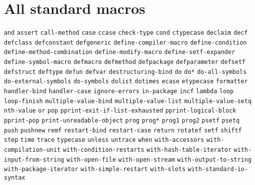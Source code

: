 \chapter{All standard macros}
\label{app-all-standard-macros}

\texttt{and}
\texttt{assert}
\texttt{call-method}
\texttt{case}
\texttt{ccase}
\texttt{check-type}
\texttt{cond}
\texttt{ctypecase}
\texttt{declaim}
\texttt{decf}
\texttt{defclass}
\texttt{defconstant}
\texttt{defgeneric}
\texttt{define-compiler-macro}
\texttt{define-condition}
\texttt{define-method-combination}
\texttt{define-modify-macro}
\texttt{define-setf-expander}
\texttt{define-symbol-macro}
\texttt{defmacro}
\texttt{defmethod}
\texttt{defpackage}
\texttt{defparameter}
\texttt{defsetf}
\texttt{defstruct}
\texttt{deftype}
\texttt{defun}
\texttt{defvar}
\texttt{destructuring-bind}
\texttt{do}
\texttt{do*}
\texttt{do-all-symbols}
\texttt{do-external-symbols}
\texttt{do-symbols}
\texttt{dolist}
\texttt{dotimes}
\texttt{ecase}
\texttt{etypecase}
\texttt{formatter}
\texttt{handler-bind}
\texttt{handler-case}
\texttt{ignore-errors}
\texttt{in-package}
\texttt{incf}
\texttt{lambda}
\texttt{loop}
\texttt{loop-finish}
\texttt{multiple-value-bind}
\texttt{multiple-value-list}
\texttt{multiple-value-setq}
\texttt{nth-value}
\texttt{or}
\texttt{pop}
\texttt{pprint-exit-if-list-exhausted}
\texttt{pprint-logical-block}
\texttt{pprint-pop}
\texttt{print-unreadable-object}
\texttt{prog}
\texttt{prog*}
\texttt{prog1}
\texttt{prog2}
\texttt{psetf}
\texttt{psetq}
\texttt{push}
\texttt{pushnew}
\texttt{remf}
\texttt{restart-bind}
\texttt{restart-case}
\texttt{return}
\texttt{rotatef}
\texttt{setf}
\texttt{shiftf}
\texttt{step}
\texttt{time}
\texttt{trace}
\texttt{typecase}
\texttt{unless}
\texttt{untrace}
\texttt{when}
\texttt{with-accessors}
\texttt{with-compilation-unit}
\texttt{with-condition-restarts}
\texttt{with-hash-table-iterator}
\texttt{with-input-from-string}
\texttt{with-open-file}
\texttt{with-open-stream}
\texttt{with-output-to-string}
\texttt{with-package-iterator}
\texttt{with-simple-restart}
\texttt{with-slots}
\texttt{with-standard-io-syntax}
